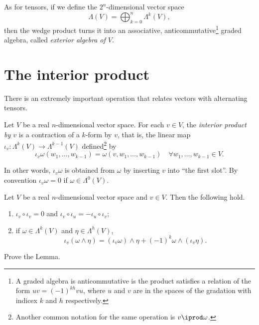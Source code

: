 \begin{remark}
  As for tensors, if we define the $2^n$-dimensional vector space
  \begin{equation}
    \Lambda(V) = \bigoplus_{k=0}^n \Lambda^k(V),
  \end{equation}
  then the wedge product turns it into an associative, anticommutative\footnote{A graded algebra is anticommutative is the product satisfies a relation of the form $uv = {(-1)}^{kh}vu$, where $u$ and $v$ are in the spaces of the gradation with indicex $k$ and $h$ respectively.} graded algebra, called \emph{exterior algebra of $V$}.
\end{remark}

\section{The interior product}

There is an extremely important operation that relates vectors with alternating tensors.

\begin{definition}
  Let $V$ be a real $n$-dimensional vector space.
  For each $v\in V$, the \emph{interior product by $v$} is a contraction of a $k$-form by $v$, that is, the linear map $\iota_v:\Lambda^{k}(V)\to \Lambda^{k-1}(V)$ defined\footnote{Another common notation for the same operation is $v \iprod \omega$.} by
  \begin{equation}
    \iota_v\omega(w_1,\ldots,w_{k-1}) = \omega(v,w_1,\ldots,w_{k-1})
    \quad \forall w_1,\ldots,w_{k-1} \in V.
  \end{equation}
\end{definition}

In other words, $\iota_v\omega$ is obtained from $\omega$ by inserting $v$ into ``the first slot''.
By convention $\iota_v\omega = 0$ if $\omega\in\Lambda^0(V)$.

\begin{lemma}\label{lemma:intprod}
  Let $V$ be a real $n$-dimensional vector space and $v\in V$.
  Then the following hold.
  \begin{enumerate}
    \item $\iota_v\circ \iota_v = 0$ and $\iota_v\circ\iota_u = -\iota_u\circ\iota_v$;
    \item if $\omega\in\Lambda^k(V)$ and $\eta\in\Lambda^h(V)$,
      \begin{equation}
        \iota_v(\omega\wedge\eta) = (\iota_v\omega)\wedge\eta + {(-1)}^k\omega\wedge(\iota_v\eta).
      \end{equation}
  \end{enumerate}
\end{lemma}
\begin{exercise}
  Prove the Lemma.
\end{exercise}

